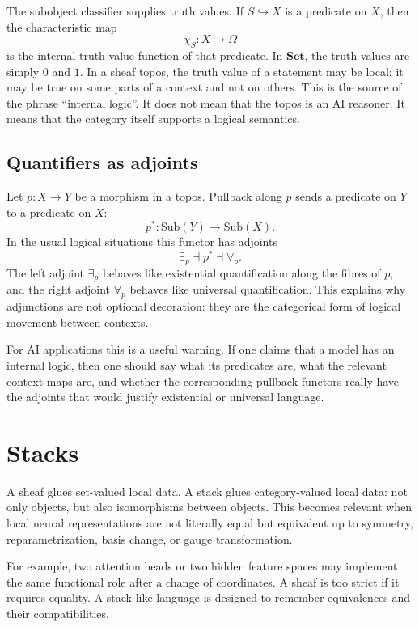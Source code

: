 \documentclass[11pt]{article}
\newcommand{\Set}{\mathbf{Set}}
\newcommand{\Sub}{\mathrm{Sub}}
\begin{document}
The subobject classifier supplies truth values. If \(S\hookrightarrow X\) is a
predicate on \(X\), then the characteristic map
\[
\chi_S:X\to \Omega
\]
is the internal truth-value function of that predicate. In \(\Set\), the truth
values are simply \(0\) and \(1\). In a sheaf topos, the truth value of a
statement may be local: it may be true on some parts of a context and not on
others. This is the source of the phrase ``internal logic''. It does not mean
that the topos is an AI reasoner. It means that the category itself supports a
logical semantics.

\subsection{Quantifiers as adjoints}

Let \(p:X\to Y\) be a morphism in a topos. Pullback along \(p\) sends a
predicate on \(Y\) to a predicate on \(X\):
\[
p^\ast:\Sub(Y)\longrightarrow \Sub(X).
\]
In the usual logical situations this functor has adjoints
\[
\exists_p\dashv p^\ast \dashv \forall_p .
\]
The left adjoint \(\exists_p\) behaves like existential quantification along the
fibres of \(p\), and the right adjoint \(\forall_p\) behaves like universal
quantification. This explains why adjunctions are not optional decoration: they
are the categorical form of logical movement between contexts.

For AI applications this is a useful warning. If one claims that a model has an
internal logic, then one should say what its predicates are, what the relevant
context maps are, and whether the corresponding pullback functors really have
the adjoints that would justify existential or universal language.

\section{Stacks}

A sheaf glues set-valued local data. A stack glues category-valued local data:
not only objects, but also isomorphisms between objects. This becomes relevant
when local neural representations are not literally equal but equivalent up to
symmetry, reparametrization, basis change, or gauge transformation.

For example, two attention heads or two hidden feature spaces may implement the
same functional role after a change of coordinates. A sheaf is too strict if it
requires equality. A stack-like language is designed to remember equivalences
and their compatibilities.
\end{document}
